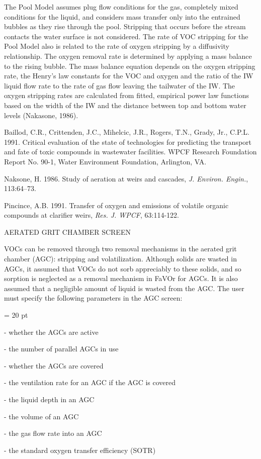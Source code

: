 The Pool Model assumes plug flow conditions for the gas, completely mixed
conditions for the liquid, and considers mass transfer only into the entrained
bubbles as they rise through the pool.  Stripping that occurs before the stream
contacts the water surface is not considered.  The rate of VOC stripping for
the Pool Model also is related to the rate of oxygen stripping by a diffusivity
relationship.  The oxygen removal rate is determined by applying a mass balance
to the rising bubble. The mass balance equation depends on the oxygen stripping
rate, the Henry's law constants for the VOC and oxygen and the ratio of the IW
liquid flow rate to the rate of gas flow leaving the tailwater of the IW. The
oxygen stripping rates are calculated from fitted, empirical power law
functions based on the width of the IW and the distance between top and bottom
water levels (Nakasone, 1986). 


Baillod, C.R., Crittenden, J.C., Mihelcic, J.R., Rogers, T.N., Grady, Jr.,
C.P.L. 1991. Critical evaluation of the state of technologies for predicting
the transport and fate of toxic compounds in wastewater facilities. WPCF
Research Foundation Report No. 90-1, Water Environment Foundation, Arlington,
VA.

Naksone, H. 1986. Study of aeration at weirs and cascades, {\it J. Environ.
Engin.}, 113:64--73.

Pincince, A.B. 1991. Transfer of oxygen and emissions of volatile organic
compounds at clarifier weirs, {\it Res. J. WPCF}, 63:114-122.




\newpage

AERATED GRIT CHAMBER SCREEN

VOCs can be removed through two removal mechanisms in the aerated grit chamber
(AGC): stripping and volatilization.  Although solids are wasted in AGCs, it
assumed that VOCs do not sorb appreciably to these solids, and so sorption is
neglected as a removal mechanism in FaVOr for AGCs.  It is also assumed that a
negligible amount of liquid is wasted from the AGC.  The user must specify the
following parameters in the AGC screen:

{\parindent = 20 pt

\item{-} whether the AGCs are active 

\item{-} the number of parallel AGCs in use

\item{-} whether the AGCs are covered 

\item{-} the ventilation rate for an AGC if the AGC is covered

\item{-} the liquid depth in an AGC

\item{-} the volume of an AGC

\item{-} the gas flow rate into an AGC 

\item{-} the standard oxygen transfer efficiency (SOTR)

}

